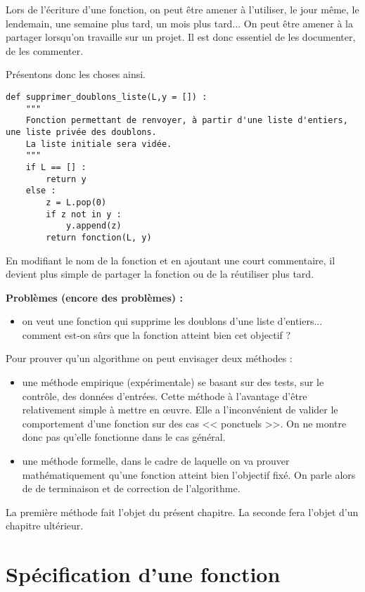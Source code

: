 Lors de l'écriture d'une fonction, on peut être amener à l'utiliser, le jour même, le lendemain, une semaine plus tard, un mois plus tard... On peut être amener à la partager lorsqu'on travaille sur un projet. 
Il est donc essentiel de les documenter, de les commenter.

Présentons donc les choses ainsi. 

\begin{lstlisting}
def supprimer_doublons_liste(L,y = []) :
    """
    Fonction permettant de renvoyer, à partir d'une liste d'entiers, une liste privée des doublons. 
    La liste initiale sera vidée. 
    """
    if L == [] : 
        return y
    else : 
        z = L.pop(0)
        if z not in y : 
            y.append(z)
        return fonction(L, y)
\end{lstlisting}

En modifiant le nom de la fonction et en ajoutant une court commentaire, il devient plus simple de partager la fonction ou de la réutiliser plus tard. 

\textbf{Problèmes (encore des problèmes) :}
\begin{itemize}
\item on veut une fonction qui supprime les doublons d'une liste d'entiers... comment est-on sûrs que la fonction atteint bien cet objectif ?
\end{itemize}
 
Pour prouver qu'un algorithme on peut envisager deux méthodes : 
\begin{itemize}
\item une méthode empirique (expérimentale) se basant sur des tests, sur le contrôle, des données d'entrées. Cette méthode à l'avantage d'être relativement simple à mettre en \oe{}uvre. Elle a l'inconvénient de valider le comportement d'une fonction sur des cas << ponctuels >>. On ne montre donc pas qu'elle fonctionne dans le cas général. 
\item une méthode formelle, dans le cadre de laquelle on va prouver mathématiquement qu'une fonction atteint bien l'objectif fixé. On parle alors de de terminaison et de correction de l'algorithme.
\end{itemize}

La première méthode fait l'objet du présent chapitre. La seconde fera l'objet d'un chapitre ultérieur. 




\section{Spécification d'une fonction}

